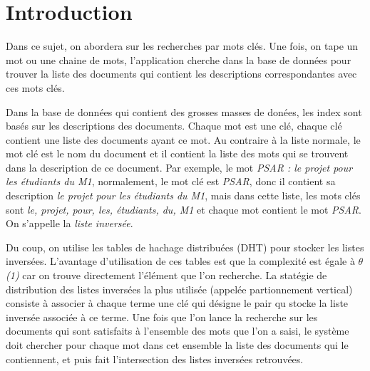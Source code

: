 
\chapter{Introduction}
	{\Huge D}ans ce sujet, on abordera sur les recherches par mots clés. Une fois, on tape un mot ou une chaine de mots, l'application cherche dans la base de données pour trouver la liste des documents qui contient les descriptions correspondantes avec ces mots clés.
	
	Dans la base de données qui contient des grosses masses de donées, les index sont basés sur les descriptions des documents. Chaque mot est une clé, chaque clé contient une liste des documents ayant ce mot. Au contraire à la liste normale, le mot clé est le nom du document et il contient la liste des mots qui se trouvent dans la description de ce document. Par exemple, le mot {\em PSAR : le projet pour les étudiants du M1}, normalement, le mot clé est {\em PSAR}, donc il contient sa description {\em le projet pour les étudiants du M1}, mais dans cette liste, les mots clés sont {\em le, projet, pour, les, étudiants, du, M1} et chaque mot contient le mot {\em PSAR}. On s'appelle la {\em liste inversée}.
	
	Du coup, on utilise les tables de hachage distribuées (DHT) pour stocker les listes inversées. L'avantage d'utilisation de ces tables est que la complexité est égale à $ \theta ${\em (1)} car on trouve directement l'élément que l'on recherche. La statégie de distribution des listes inversées la plus utilisée (appelée partionnement vertical) consiste à associer à chaque terme une clé qui désigne le pair qu stocke la liste inversée associée à ce terme. Une fois que l'on lance la recherche sur les documents qui sont satisfaits à l'ensemble des mots que l'on a saisi, le système doit chercher pour chaque mot dans cet ensemble la liste des documents qui le contiennent, et puis fait l'intersection des listes inversées retrouvées. 
